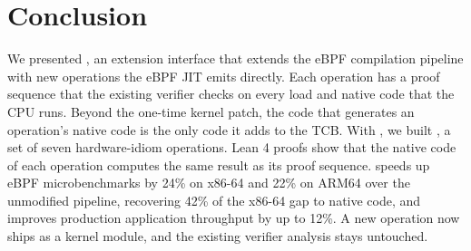 


\section{Conclusion}
\label{sec:conclusion}

We presented \tool, an extension interface that extends the eBPF compilation pipeline with new operations the eBPF JIT emits directly.
Each operation has a proof sequence that the existing verifier checks on every load and native code that the CPU runs.
Beyond the one-time kernel patch, the code that generates an operation's native code is the only code it adds to the TCB.
With \tool, we built \lang, a set of seven hardware-idiom operations.
Lean 4 proofs show that the native code of each \lang operation computes the same result as its proof sequence.
\lang speeds up eBPF microbenchmarks by 24\% on x86-64 and 22\% on ARM64 over the unmodified pipeline, recovering 42\% of the x86-64 gap to native code, and improves production application throughput by up to 12\%.
A new operation now ships as a kernel module, and the existing verifier analysis stays untouched.
